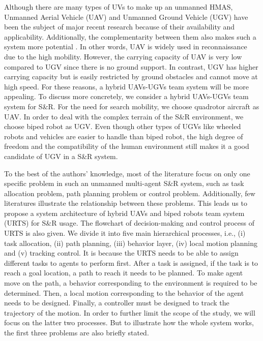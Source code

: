 \documentclass{ieeeaccess}
\begin{document}
Although there are many types of UVs to make up an unmanned HMAS, Unmanned Aerial Vehicle (UAV) and Unmanned Ground Vehicle (UGV) have been the subject of major recent research because of their availability and applicability. Additionally, the complementarity between them also makes such a system more potential \cite{arbanas2018decentralized}. In other words, UAV is widely used in reconnaissance due to the high mobility. However, the carrying capacity of UAV is very low compared to UGV since there is no ground support. In contrast, UGV has higher carrying capacity but is easily restricted by ground obstacles and cannot move at high speed. For these reasons, a hybrid UAVs-UGVs team system will be more appealing. To discuss more concretely, we consider a hybrid UAVs-UGVs team system for S\&R. For the need for search mobility, we choose quadrotor aircraft as UAV. In order to deal with the complex terrain of the S\&R environment, we choose biped robot as UGV. Even though other types of UGVs like wheeled robots and vehicles are easier to handle than biped robot, the high degree of freedom and the compatibility of the human environment still makes it a good candidate of UGV in a S\&R system.

To the best of the authors' knowledge, most of the literature focus on only one specific problem in such an unmanned multi-agent S\&R system, such as task allocation problem, path planning problem or control problem. Additionally, few literatures illustrate the relationship between these problems. This leads us to propose a system architecture of hybrid UAVs and biped robots team system (URTS) for S\&R usage. The flowchart of decision-making and control process of URTS is also given. We divide it into five main hierarchical processes, i.e., (i) task allocation, (ii) path planning, (iii) behavior layer, (iv) local motion planning and (v) tracking control. It is because the URTS needs to be able to assign different tasks to agents to perform first. After a task is assigned, if the task is to reach a goal location, a path to reach it needs to be planned. To make agent move on the path, a behavior corresponding to the environment is required to be determined. Then, a local motion corresponding to the behavior of the agent needs to be designed. Finally, a controller must be designed to track the trajectory of the motion. In order to further limit the scope of the study, we will focus on the latter two processes. But to illustrate how the whole system works, the first three problems are also briefly stated.
\end{document}
